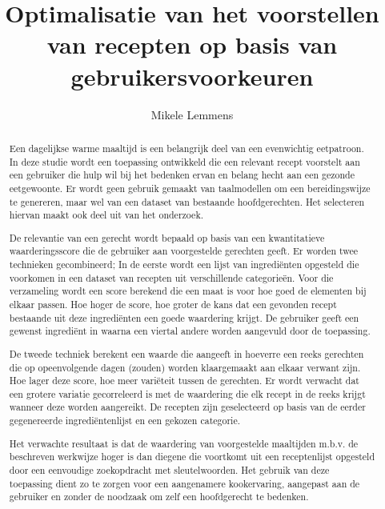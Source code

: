 \documentclass{hogent-article}
\title{Optimalisatie van het voorstellen van recepten op basis van gebruikersvoorkeuren}
\author{Mikele Lemmens}
\begin{document}
\begin{abstract}
    
Een dagelijkse warme maaltijd is een belangrijk deel van een evenwichtig eetpatroon. In deze studie wordt een toepassing ontwikkeld die een relevant recept voorstelt aan een gebruiker die hulp wil bij het bedenken ervan en belang hecht aan een gezonde eetgewoonte. Er wordt geen gebruik gemaakt van taalmodellen om een bereidingswijze te genereren, maar wel van een dataset van bestaande hoofdgerechten. Het selecteren hiervan maakt ook deel uit van het onderzoek.

De relevantie van een gerecht wordt bepaald op basis van een kwantitatieve waarderingsscore die de gebruiker aan voorgestelde gerechten geeft. Er worden twee technieken gecombineerd; In de eerste wordt een lijst van ingrediënten opgesteld die voorkomen in een dataset van recepten uit verschillende categorieën. Voor die verzameling wordt een score berekend die een maat is voor hoe goed de elementen bij elkaar passen. Hoe hoger de score, hoe groter de kans dat een gevonden recept bestaande uit deze ingrediënten een goede waardering krijgt. De gebruiker geeft een gewenst ingrediënt in waarna een viertal andere worden aangevuld door de toepassing.

De tweede techniek berekent een waarde die aangeeft in hoeverre een reeks gerechten die op opeenvolgende dagen (zouden) worden klaargemaakt aan elkaar verwant zijn. Hoe lager deze score, hoe meer variëteit tussen de gerechten. Er wordt verwacht dat een grotere variatie gecorreleerd is met de waardering die elk recept in de reeks krijgt wanneer deze worden aangereikt. De recepten zijn geselecteerd op basis van de eerder gegenereerde ingrediëntenlijst en een gekozen categorie.

Het verwachte resultaat is dat de waardering van voorgestelde maaltijden m.b.v. de beschreven werkwijze hoger is dan diegene die voortkomt uit een receptenlijst opgesteld door een eenvoudige zoekopdracht met sleutelwoorden. Het gebruik van deze toepassing dient zo te zorgen voor een aangenamere kookervaring, aangepast aan de gebruiker en zonder de noodzaak om zelf een hoofdgerecht te bedenken.


\end{abstract}

\tableofcontents

\bigskip

\end{document}
